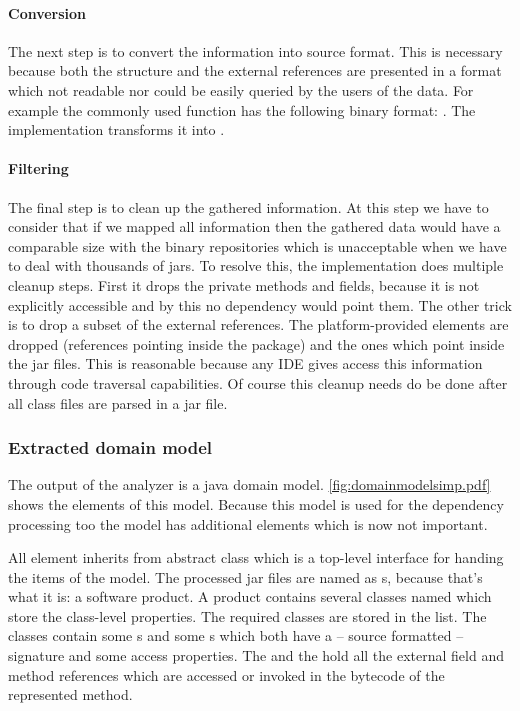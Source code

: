 \paragraph{Conversion}
The next step is to convert the information into source format. This is
necessary because both the structure and the external references are presented
in a format which not readable nor could be easily queried by the users of the
data. For example the commonly used  function has the
following binary format: . The implementation
transforms it into .

\paragraph{Filtering}
The final step is to clean up the gathered information. At this step we have to
consider that if we mapped all information then the gathered data would have a
comparable size with the binary repositories which is unacceptable when we have
to deal with thousands of jars. To resolve this, the implementation does
multiple cleanup steps. First it drops the private methods and fields, because
it is not explicitly accessible and by this no dependency would point them. The
other trick is to drop a subset of the external references. The
platform-provided elements are dropped (references pointing inside the
 package) and the ones which point inside the jar files. This is
reasonable because any IDE gives access this information through code traversal
capabilities. Of course this cleanup needs do be done after all class files are 
parsed in a jar file. 


\subsubsection{Extracted domain model}
The output of the analyzer is a java domain model.
\autoref{fig:domainmodelsimp.pdf} shows the elements of this model. Because this
model is used for the dependency processing too the model has additional
elements which is now not important.

All element inherits from abstract  class which is a top-level
interface for handing the items of the model. The processed jar files are named
as s, because that's what it is: a software product. A product
contains several classes named  which store the class-level
properties. The required classes are stored in the 
list. The classes contain some s and some s which both
have a -- source formatted -- signature and some access properties. The
 and the  hold all the external
field and method references which are accessed or invoked in the bytecode of the
represented method.

